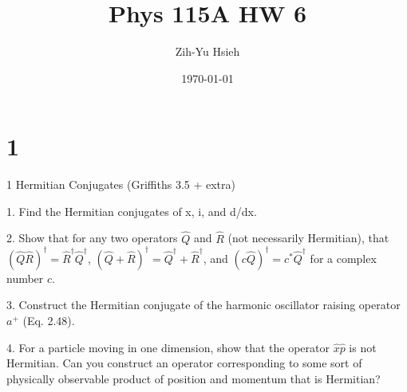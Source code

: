 \documentclass{article}
\title{Phys 115A HW 6}
\author{Zih-Yu Hsieh}
\date{\today}
\begin{document}
\maketitle

\section*{1}

\begin{ques}\label{q1}
1 Hermitian Conjugates (Griffiths 3.5 + extra)

1. Find the Hermitian conjugates of x, i, and d/dx.

2. Show that for any two operators $\hat{Q}$ and $\hat{R}$ (not necessarily Hermitian), that $(\hat{Q}\hat{R})^\dagger = \hat{R}^\dagger \hat{Q}^\dagger$, $(\hat{Q}+ \hat{R})^\dagger = \hat{Q}^\dagger + \hat{R}^\dagger$, and $(c\hat{Q})^\dagger = c^\ast \hat{Q}^\dagger$ for a complex number $c$.

3. Construct the Hermitian conjugate of the harmonic oscillator raising operator $a^+$ (Eq. 2.48).

4. For a particle moving in one dimension, show that the operator $\hat{x}\hat{p}$ is not Hermitian. Can you construct an operator corresponding to some sort of physically observable product of position and momentum that is Hermitian?
\end{ques}
\end{document}
